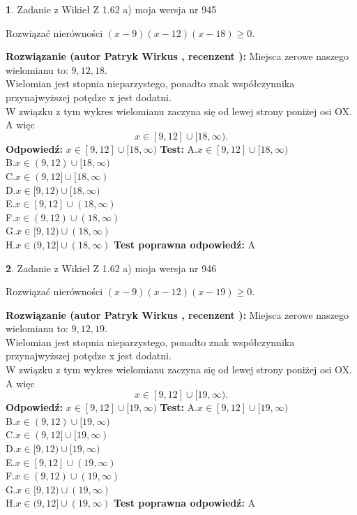 \documentclass[12pt, a4paper]{article}
\theoremstyle{definition} %
\newtheorem{zad}{}
\newcommand{\zadStart}[1]{\begin{zad}#1\newline}
\newcommand{\zadStop}{\end{zad}}
\newcommand{\rozwStart}[2]{\noindent \textbf{Rozwiązanie (autor #1 , recenzent #2): }\newline}
\newcommand{\rozwStop}{\newline}
\newcommand{\odpStart}{\noindent \textbf{Odpowiedź:}\newline}
\newcommand{\odpStop}{\newline}
\newcommand{\testStart}{\noindent \textbf{Test:}\newline}
\newcommand{\testStop}{\newline}
\newcommand{\kluczStart}{\noindent \textbf{Test poprawna odpowiedź:}\newline}
\newcommand{\kluczStop}{\newline}
\begin{document}
\zadStart{Zadanie z Wikieł Z 1.62 a) moja wersja nr 945}

Rozwiązać nierówności $(x-9)(x-12)(x-18)\ge0$.
\zadStop
\rozwStart{Patryk Wirkus}{}
Miejsca zerowe naszego wielomianu to: $9, 12, 18$.\\
Wielomian jest stopnia nieparzystego, ponadto znak współczynnika przy\linebreak najwyższej potędze x jest dodatni.\\ W związku z tym wykres wielomianu zaczyna się od lewej strony poniżej osi OX. A więc $$x \in [9,12] \cup [18,\infty).$$
\rozwStop
\odpStart
$x \in [9,12] \cup [18,\infty)$
\odpStop
\testStart
A.$x \in [9,12] \cup [18,\infty)$\\
B.$x \in (9,12) \cup [18,\infty)$\\
C.$x \in (9,12] \cup [18,\infty)$\\
D.$x \in [9,12) \cup [18,\infty)$\\
E.$x \in [9,12] \cup (18,\infty)$\\
F.$x \in (9,12) \cup (18,\infty)$\\
G.$x \in [9,12) \cup (18,\infty)$\\
H.$x \in (9,12] \cup (18,\infty)$
\testStop
\kluczStart
A
\kluczStop



\zadStart{Zadanie z Wikieł Z 1.62 a) moja wersja nr 946}

Rozwiązać nierówności $(x-9)(x-12)(x-19)\ge0$.
\zadStop
\rozwStart{Patryk Wirkus}{}
Miejsca zerowe naszego wielomianu to: $9, 12, 19$.\\
Wielomian jest stopnia nieparzystego, ponadto znak współczynnika przy\linebreak najwyższej potędze x jest dodatni.\\ W związku z tym wykres wielomianu zaczyna się od lewej strony poniżej osi OX. A więc $$x \in [9,12] \cup [19,\infty).$$
\rozwStop
\odpStart
$x \in [9,12] \cup [19,\infty)$
\odpStop
\testStart
A.$x \in [9,12] \cup [19,\infty)$\\
B.$x \in (9,12) \cup [19,\infty)$\\
C.$x \in (9,12] \cup [19,\infty)$\\
D.$x \in [9,12) \cup [19,\infty)$\\
E.$x \in [9,12] \cup (19,\infty)$\\
F.$x \in (9,12) \cup (19,\infty)$\\
G.$x \in [9,12) \cup (19,\infty)$\\
H.$x \in (9,12] \cup (19,\infty)$
\testStop
\kluczStart
A
\kluczStop
\end{document}
